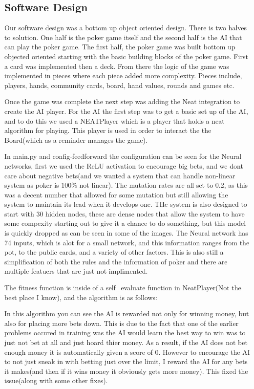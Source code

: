 \subsection{Software Design}
Our software design was a bottom up object oriented design. There is two halves to solution. One half is the poker game itself and the second half is the AI that can play the poker game. The first half, the poker game was built bottom up objected oriented starting with the basic building blocks of the poker game. First a card was implemented then a deck. From there the logic of the game was implemented in pieces where each piece added more complexity. Pieces include, players, hands, community cards, board, hand values, rounds and games etc. 

Once the game was complete the next step was adding the Neat integration to create the AI player. For the AI
the first step was to get a basic set up of the AI, and to do this we used a NEATPlayer which is a player that
holds a neat algorithm for playing. This player is used in order to interact the the Board(which as a reminder
manages the game).

In main.py and config-feedforward the configuration can be seen for the Neural networks, first we used the ReLU
activation to encourage big bets, and we dont care about negative bets(and we wanted a system that can handle
non-linear system as poker is 100\% not linear). The mutation rates are all set to 0.2, as this was a decent
number that allowed for some mutation but still allowing the system to maintain its lead when it develops one.
THe system is also designed to start with 30 hidden nodes, these are dense nodes that allow the system to have
some compexity starting out to give it a chance to do something, but this model is quickly dropped as can be
seen in some of the images. The Neural network has 74 inputs, which is alot for a small network, and this
information ranges from the pot, to the public cards, and a variety of other factors. This is also still a
simplification of both the rules and the information of poker and there are multiple featuers that are just not implimented.

The fitness function is inside of a self_evaluate function in NeatPlayer(Not the best place I know), and the
algorithm is as follows: 

In this algorithm you can see the AI is rewarded not only for winning money, but also for placing more bets
down. This is due to the fact that one of the earlier problems occured in training was the AI would learn the
best way to win was to just not bet at all and just hoard thier money. As a result, if the AI does not bet
enough money it is automatically given a score of 0. However to encourage the AI to not just sneak in with betting just over the limit, I reward the AI for any bets it makes(and then if it wins money it obviously gets more
money). This fixed the issue(along with some other fixes).

